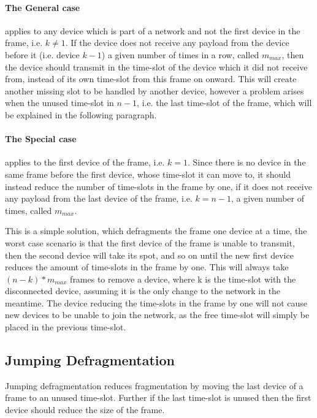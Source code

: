 \paragraph{The General case}applies to any device which is part of a network and not the first device in the frame, i.e. $k \neq 1$.
If the device does not receive any payload from the device before it (i.e. device $k - 1$) a given number of times in a row, called $m_{max}$, then the device should transmit in the time-slot of the device which it did not receive from, instead of its own time-slot from this frame on onward. 
This will create another missing slot to be handled by another device, however a problem arises when the unused time-slot in $n - 1$, i.e. the last time-slot of the frame, which will be explained in the following paragraph.

\paragraph{The Special case}applies to the first device of the frame, i.e. $k = 1$. 
Since there is no device in the same frame before the first device, whose time-slot it can move to, it should instead reduce the number of time-slots in the frame by one, if it does not receive any payload from the last device of the frame, i.e. $k = n - 1$, a given number of times, called $m_{max}$. 


\bigskip

This is a simple solution, which defragments the frame one device at a time, the worst case scenario is that the first device of the frame is unable to transmit, then the second device will take its spot, and so on until the new first device reduces the amount of time-slots in the frame by one. 
This will always take $(n - k) * m_{max}$ frames to remove a device, where k is the time-slot with the disconnected device, assuming it is the only change to the network in the meantime. 
The device reducing the time-slots in the frame by one will not cause new devices to be unable to join the network, as the free time-slot will simply be placed in the previous time-slot. 

\subsection{Jumping Defragmentation}
Jumping defragmentation reduces fragmentation by moving the last device of a frame to an unused time-slot. Further if the last time-slot is unused then the first device should reduce the size of the frame.

